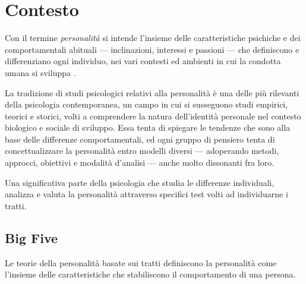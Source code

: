 \chapter{Contesto}
\label{chap:contesto}

Con il termine \emph{personalità} si intende l'insieme delle caratteristiche psichiche e dei comportamentali abituali --- inclinazioni, interessi e passioni --- che definiscono e differenziano ogni individuo, nei vari contesti ed ambienti in cui la condotta umana si sviluppa \cite{corr2009cambridge,sadock2000comprehensive}.

La tradizione di studi psicologici relativi alla personalità è una delle più rilevanti della psicologia contemporanea, un campo in cui si susseguono studi empirici, teorici e storici, volti a comprendere la natura dell'identità personale nel contesto biologico e sociale di sviluppo.
Essa tenta di spiegare le tendenze che sono alla base delle differenze comportamentali, ed ogni gruppo di pensiero tenta di concettualizzare la personalità entro modelli diversi --- adoperando metodi, approcci, obiettivi e modalità d'analisi --- anche molto dissonanti fra loro.

Una significativa parte della psicologia che studia le differenze individuali, analizza e valuta la personalità attraverso specifici test volti ad individuarne i tratti.

\section{Big Five}
\label{sec:big5}

Le teorie della personalità basate sui tratti definiscono la personalità come l'insieme delle caratteristiche che stabiliscono il comportamento di una persona. 

